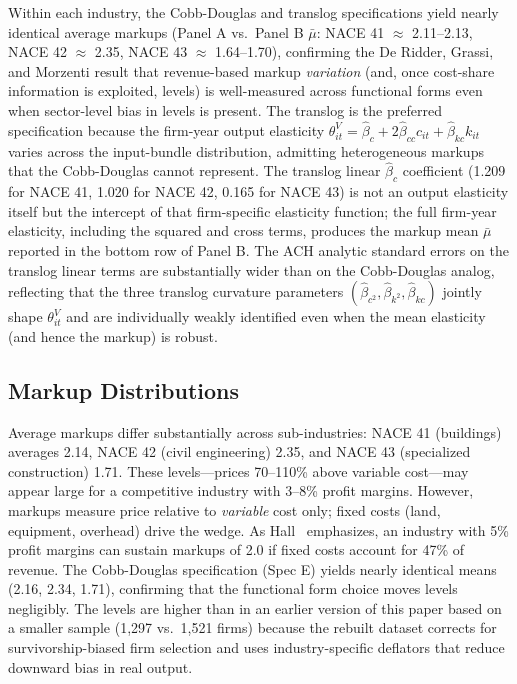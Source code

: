 \documentclass[11pt]{article}
\begin{document}
Within each industry, the Cobb-Douglas and translog specifications yield nearly identical average markups (Panel A vs.\ Panel B $\bar\mu$: NACE 41 $\approx$ 2.11--2.13, NACE 42 $\approx$ 2.35, NACE 43 $\approx$ 1.64--1.70), confirming the De Ridder, Grassi, and Morzenti \cite{DGM2026} result that revenue-based markup \emph{variation} (and, once cost-share information is exploited, levels) is well-measured across functional forms even when sector-level bias in levels is present. The translog is the preferred specification because the firm-year output elasticity $\theta^V_{it} = \hat\beta_c + 2\hat\beta_{cc} c_{it} + \hat\beta_{kc} k_{it}$ varies across the input-bundle distribution, admitting heterogeneous markups that the Cobb-Douglas cannot represent. The translog linear $\hat\beta_c$ coefficient (1.209 for NACE 41, 1.020 for NACE 42, 0.165 for NACE 43) is not an output elasticity itself but the intercept of that firm-specific elasticity function; the full firm-year elasticity, including the squared and cross terms, produces the markup mean $\bar\mu$ reported in the bottom row of Panel B. The ACH analytic standard errors on the translog linear terms are substantially wider than on the Cobb-Douglas analog, reflecting that the three translog curvature parameters $(\hat\beta_{c^2}, \hat\beta_{k^2}, \hat\beta_{kc})$ jointly shape $\theta^V_{it}$ and are individually weakly identified even when the mean elasticity (and hence the markup) is robust.



\subsection{Markup Distributions}\label{sec:markups}

Average markups differ substantially across sub-industries: NACE 41 (buildings) averages 2.14, NACE 42 (civil engineering) 2.35, and NACE 43 (specialized construction) 1.71. These levels---prices 70--110\% above variable cost---may appear large for a competitive industry with 3--8\% profit margins. However, markups measure price relative to \emph{variable} cost only; fixed costs (land, equipment, overhead) drive the wedge. As Hall~\cite{Hall2018} emphasizes, an industry with 5\% profit margins can sustain markups of 2.0 if fixed costs account for 47\% of revenue. The Cobb-Douglas specification (Spec E) yields nearly identical means (2.16, 2.34, 1.71), confirming that the functional form choice moves levels negligibly. The levels are higher than in an earlier version of this paper based on a smaller sample (1,297 vs.\ 1,521 firms) because the rebuilt dataset corrects for survivorship-biased firm selection and uses industry-specific deflators that reduce downward bias in real output.
\end{document}
